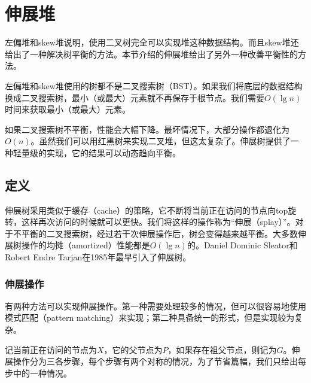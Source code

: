 \documentclass[b5paper]{ctexart}
\begin{document}
\section{伸展堆}
\label{splayheap}

左偏堆和skew堆说明，使用二叉树完全可以实现堆这种数据结构。而且skew堆还给出了一种解决树平衡的方法。本节介绍的伸展堆给出了另外一种改善平衡性的方法。

左偏堆和skew堆使用的树都不是二叉搜索树（BST）。如果我们将底层的数据结构换成二叉搜索树，最小（或最大）元素就不再保存于根节点。我们需要$O(\lg n)$时间来获取最小（或最大）元素。

如果二叉搜索树不平衡，性能会大幅下降。最坏情况下，大部分操作都退化为$O(n)$。虽然我们可以用红黑树来实现二叉堆，但这太复杂了。伸展树提供了一种轻量级的实现，它的结果可以动态趋向平衡。


\subsection{定义}

伸展树采用类似于缓存（cache）的策略，它不断将当前正在访问的节点向top旋转，这样再次访问的时候就可以更快。我们将这样的操作称为“伸展（splay）”。对于不平衡的二叉搜索树，经过若干次伸展操作后，树会变得越来越平衡。大多数伸展树操作的均摊（amortized）性能都是$O(\lg n)$的。Daniel Dominic Sleator和Robert Endre Tarjan在1985年最早引入了伸展树\cite{wiki-splay-tree}\cite{self-adjusting-trees}。

\subsubsection{伸展操作}

有两种方法可以实现伸展操作。第一种需要处理较多的情况，但可以很容易地使用模式匹配（pattern matching）来实现；第二种具备统一的形式，但是实现较为复杂。

记当前正在访问的节点为$X$，它的父节点为$P$，如果存在祖父节点，则记为$G$。伸展操作分为三各步骤，每个步骤有两个对称的情况，为了节省篇幅，我们只给出每步中的一种情况。
\end{document}
